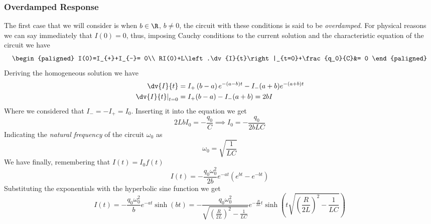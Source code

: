 \documentclass[../electromagnetism.tex]{subfiles}
\begin{document}
\subsubsection{Overdamped Response}
The first case that we will consider is when $b\in\R$, $b\ne 0$, the circuit with these conditions is said to be \textit{overdamped}. For physical reasons we can say immediately that $I(0)=0$, thus, imposing Cauchy conditions to the current solution and the characteristic equation of the circuit we have
\begin{equation*}
	\begin{paligned}
		I(0)=I_{+}+I_{-}= 0\\
		RI(0)+L\left.\dv{I}{t}\right|_{t=0}+\frac{q_0}{C}&= 0
	\end{paligned}
\end{equation*}
Deriving the homogeneous solution we have
\begin{equation*}
	\begin{aligned}
		\dv{I}{t}&= I_+\left( b-a \right)e^{-(a-b)t}-I_{-}(a+b)e^{-(a+b)t}\\
		\left.\dv{I}{t}\right|_{t=0}&= I_{+}(b-a)-I_{-}(a+b)=2bI
	\end{aligned}
\end{equation*}
Where we considered that $I_{-}=-I_{+}=I_0$. Inserting it into the equation we get
\begin{equation*}
	2LbI_0=-\frac{q_0}{C}\implies I_0=-\frac{q_0}{2bLC}
\end{equation*}
Indicating the \textit{natural frequency} of the circuit $\omega_0$ as
\begin{equation}
	\omega_0=\sqrt{\frac{1}{LC}}
	\label{eq:natfreq.rlc}
\end{equation}
We have finally, remembering that $I(t)=I_0f(t)$
\begin{equation*}
	I(t)=-\frac{q_0\omega_0^2}{2b}e^{-at}\left( e^{bt}-e^{-bt} \right)
\end{equation*}
Substituting the exponentials with the hyperbolic sine function we get
\begin{equation}
	I(t)=-\frac{q_0\omega_0^2}{b}e^{-at}\sinh(bt)=-\frac{q_0\omega_0^2}{\sqrt{\left( \frac{R}{2L} \right)^2-\frac{1}{LC}}}e^{-\frac{R}{2L}t}\sinh\left( t\sqrt{\left( \frac{R}{2L} \right)^2-\frac{1}{LC}} \right)
\label{eq:overdamped.rlc}
\end{equation}
\end{document}
